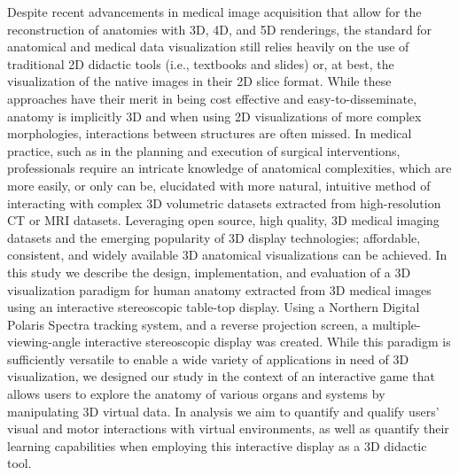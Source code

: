 \documentclass[]{spie}  %
\begin{document}
Despite recent advancements in medical image acquisition that allow for the reconstruction of anatomies with 3D, 4D, and 5D renderings, the standard for anatomical and medical data visualization still relies heavily on the use of traditional 2D didactic tools (i.e., textbooks and slides) or, at best, the visualization of the native images in their 2D slice format. While these approaches have their merit in being cost effective and easy-to-disseminate, anatomy is implicitly 3D and when using 2D visualizations of more complex morphologies, interactions between structures are often missed. In medical practice, such as in the planning and execution of surgical interventions, professionals require an intricate knowledge of anatomical complexities, which are more easily, or only can be, elucidated with more natural, intuitive method of interacting with complex 3D volumetric datasets extracted from high-resolution CT or MRI datasets. Leveraging open source, high quality, 3D medical imaging datasets and the emerging popularity of 3D display technologies; affordable, consistent, and widely available 3D anatomical visualizations can be achieved. In this study we describe the design, implementation, and evaluation of a 3D visualization paradigm for human anatomy extracted from 3D medical images using an interactive stereoscopic table-top display. Using a Northern Digital Polaris Spectra tracking system, and a reverse projection screen, a multiple-viewing-angle interactive stereoscopic display was created. While this paradigm is sufficiently versatile to enable a wide variety of applications in need of 3D visualization, we designed our study in the context of an interactive game that allows users to explore the anatomy of various organs and systems by manipulating 3D virtual data. In analysis we aim to quantify and qualify users’ visual and motor interactions with virtual environments, as well as quantify their learning capabilities when employing this interactive display as a 3D didactic tool.	

%
 \\
%
\skiplinehalf
\end{document}
